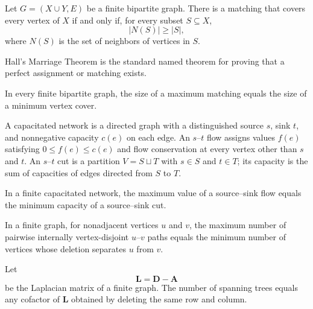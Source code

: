     \begin{theorem}
        Let $G=(X\cup Y,E)$ be a finite bipartite graph. There is a matching
        that covers every vertex of $X$ if and only if, for every subset
        $S\subseteq X$,
        \[
            |N(S)|\geq |S|,
        \]
        where $N(S)$ is the set of neighbors of vertices in $S$.
    \end{theorem}

    \begin{strategy}
        Hall's Marriage Theorem is the standard named theorem for proving that
        a perfect assignment or matching exists.
    \end{strategy}

    \begin{theorem}
        In every finite bipartite graph, the size of a maximum matching equals
        the size of a minimum vertex cover.
    \end{theorem}

    \begin{definition}
        A capacitated network is a directed graph with a distinguished source
        $s$, sink $t$, and nonnegative capacity $c(e)$ on each edge. An
        $s$--$t$ flow assigns values $f(e)$ satisfying
        $0\leq f(e)\leq c(e)$ and flow conservation at every vertex other than
        $s$ and $t$. An $s$--$t$ cut is a partition $V=S\sqcup T$ with
        $s\in S$ and $t\in T$; its capacity is the sum of capacities of edges
        directed from $S$ to $T$.
    \end{definition}

    \begin{theorem}
        In a finite capacitated network, the maximum value of a source--sink
        flow equals the minimum capacity of a source--sink cut.
    \end{theorem}

    \begin{theorem}
        In a finite graph, for nonadjacent vertices $u$ and $v$, the maximum
        number of pairwise internally vertex-disjoint $u$--$v$ paths equals the
        minimum number of vertices whose deletion separates $u$ from $v$.
    \end{theorem}

    \begin{theorem}
        Let
        \[
            \mathbf{L}=\mathbf{D}-\mathbf{A}
        \]
        be the Laplacian matrix of a finite graph. The number of spanning trees
        equals any cofactor of $\mathbf{L}$ obtained by deleting the same row
        and column.
    \end{theorem}

